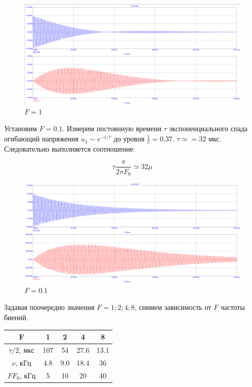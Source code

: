 \documentclass[a4paper, 14pt]{article}%
\begin{document}
\begin{enumerate}
\begin{figure}[h!]
\centering
\includegraphics[scale = 0.4]{images/plot10_1.png}
\caption{$F = 1$}
\label{fig:Image1}
\end{figure}

Установим $F = 0.1$. Измерим постоянную времени $\tau$ экспоненциального спада огибающий напряжения $u_1 \sim e^{-t/\tau}$ до уровня $\frac{1}{e} = 0.37$. $\tau \simeq = 32$ мкс. Следовательно выполняется соотношение:

\[\tau \frac{\pi}{2\pi F_0} \simeq 32 \mu\]

\begin{figure}[h!]
\centering
\includegraphics[scale = 0.4]{images/plot10_2.png}
\caption{$F = 0.1$}
\label{fig:Image1}
\end{figure}

Задавая поочередно значения $F = 1;2;4;8$, снимем зависимость от $F$ частоты биений.

\begin{center}
\begin{tabular}{|c|c|c|c|c|}
\hline 
F & 1 & 2 & 4 & 8 \\ 
\hline 
$\tau /2$, мкс & 107 & 54 & 27.6 & 13.1 \\ 
\hline 
$\nu$, кГц & 4.8 & 9.0 & 18.4 & 36 \\ 
\hline 
$FF_0$, кГц & 5 & 10 & 20 & 40 \\
\hline
\end{tabular} 
\end{center}


\end{enumerate}
\end{document}
